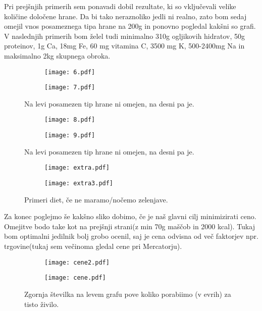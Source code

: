 \documentclass{article}
\begin{document}
\newpage

Pri prejšnjih primerih sem ponavadi dobil rezultate, ki so vključevali velike količine določene hrane. Da bi tako neraznoliko jedli ni realno, zato bom sedaj omejil vnos posameznega tipa hrane na 200g in ponovno pogledal kakšni so grafi.
V naslednjih primerih bom želel tudi minimalno 310g ogljikovih hidratov, 50g proteinov, 1g Ca, 18mg Fe, 60 mg vitamina C, 3500 mg K, 500-2400mg Na  in maksimalno 2kg skupnega obroka.

\begin{figure}[H]
\begin{subfigure}{.5\textwidth}
\texttt{[image: 6.pdf]}
\end{subfigure}
\begin{subfigure}{.5\textwidth}
\texttt{[image: 7.pdf]}
\end{subfigure}
\caption*{Na levi posamezen tip hrane ni omejen, na desni pa je.}
\end{figure}

\begin{figure}[H]
\begin{subfigure}{.5\textwidth}
\texttt{[image: 8.pdf]}
\end{subfigure}
\begin{subfigure}{.5\textwidth}
\texttt{[image: 9.pdf]}
\end{subfigure}
\caption*{Na levi posamezen tip hrane ni omejen, na desni pa je.}
\end{figure}



\begin{figure}[H]
\begin{subfigure}{.5\textwidth}
\texttt{[image: extra.pdf]}
\end{subfigure}
\begin{subfigure}{.5\textwidth}
\texttt{[image: extra3.pdf]}
\end{subfigure}
\caption*{Primeri diet, če ne maramo/nočemo zelenjave.}
\end{figure}
\newpage

Za konec poglejmo še kakšno sliko dobimo, če je naš glavni cilj minimizirati ceno. Omejitve bodo take kot na prejšnji strani(z min 70g maščob in 2000 kcal).
Tukaj bom optimalni jedilnik bolj grobo ocenil, saj je cena odvisna od več faktorjev npr. trgovine(tukaj sem večinoma gledal cene pri Mercatorju).

\begin{figure}[H]
\begin{subfigure}{.5\textwidth}
\texttt{[image: cene2.pdf]}
\end{subfigure}
\begin{subfigure}{.5\textwidth}
\texttt{[image: cene.pdf]}
\end{subfigure}
\caption*{Zgornja številka na levem grafu pove koliko porabiimo (v evrih) za tisto živilo.}
\end{figure}
\end{document}
